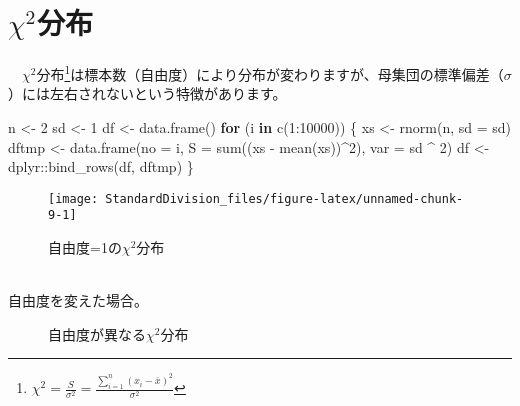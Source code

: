 \documentclass[]{tufte-handout}
\newenvironment{Shaded}{}{}
\newcommand{\AttributeTok}[1]{\textcolor[rgb]{0.49,0.56,0.16}{#1}}
\newcommand{\ControlFlowTok}[1]{\textcolor[rgb]{0.00,0.44,0.13}{\textbf{#1}}}
\newcommand{\DecValTok}[1]{\textcolor[rgb]{0.25,0.63,0.44}{#1}}
\newcommand{\FunctionTok}[1]{\textcolor[rgb]{0.02,0.16,0.49}{#1}}
\newcommand{\NormalTok}[1]{#1}
\newcommand{\OtherTok}[1]{\textcolor[rgb]{0.00,0.44,0.13}{#1}}
\newcommand{\SpecialCharTok}[1]{\textcolor[rgb]{0.25,0.44,0.63}{#1}}
\begin{document}
\newpage

\hypertarget{chi2ux5206ux5e03}{%
\section{\texorpdfstring{\(\chi^2\)分布}{\textbackslash chi\^{}2分布}}\label{chi2ux5206ux5e03}}

　\(\chi^2\)分布\footnote{\(\chi^2 = \frac{S}{\sigma^2} = \frac{\sum_{i = 1}^{n}{(x_i - \bar{x})^2}}{\sigma^2}\)}は標本数（自由度）により分布が変わりますが、母集団の標準偏差（\(\sigma\)）には左右されないという特徴があります。

\begin{Shaded}
\begin{Highlighting}[numbers=left,,]
\NormalTok{n }\OtherTok{\textless{}{-}} \DecValTok{2}
\NormalTok{sd }\OtherTok{\textless{}{-}} \DecValTok{1}
\NormalTok{df }\OtherTok{\textless{}{-}} \FunctionTok{data.frame}\NormalTok{()}
\ControlFlowTok{for}\NormalTok{ (i }\ControlFlowTok{in} \FunctionTok{c}\NormalTok{(}\DecValTok{1}\SpecialCharTok{:}\DecValTok{10000}\NormalTok{)) \{}
\NormalTok{  xs }\OtherTok{\textless{}{-}} \FunctionTok{rnorm}\NormalTok{(n, }\AttributeTok{sd =}\NormalTok{ sd)}
\NormalTok{  dftmp }\OtherTok{\textless{}{-}} \FunctionTok{data.frame}\NormalTok{(}\AttributeTok{no =}\NormalTok{ i, }\AttributeTok{S =} \FunctionTok{sum}\NormalTok{((xs }\SpecialCharTok{{-}} \FunctionTok{mean}\NormalTok{(xs))}\SpecialCharTok{\^{}}\DecValTok{2}\NormalTok{), }\AttributeTok{var =}\NormalTok{ sd }\SpecialCharTok{\^{}} \DecValTok{2}\NormalTok{)}
\NormalTok{  df }\OtherTok{\textless{}{-}}\NormalTok{ dplyr}\SpecialCharTok{::}\FunctionTok{bind\_rows}\NormalTok{(df, dftmp)}
\NormalTok{\}}
\end{Highlighting}
\end{Shaded}

\begin{figure}

{\centering \texttt{[image: StandardDivision\_files/figure-latex/unnamed-chunk-9-1]} 

}

\caption[自由度=1の$\chi^2$分布]{自由度=1の$\chi^2$分布}\label{fig:unnamed-chunk-9}
\end{figure}

　\\
自由度を変えた場合。

\begin{figure}

{\centering {}

}

\caption[自由度が異なる$\chi^2$分布]{自由度が異なる$\chi^2$分布}\label{fig:unnamed-chunk-10}
\end{figure}
\end{document}
